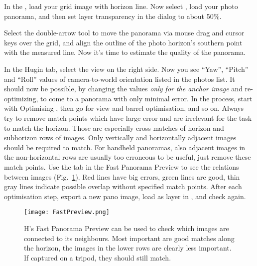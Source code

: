 In the , load your grid image with horizon line.  Now
select , load your photo panorama,
and then set layer transparency in the  dialog to about
50\%.

Select the double-arrow tool to move the panorama via mouse drag and
cursor keys over the grid, and align the outline of the photo
horizon's southern point with the measured line. Now it's time to
estimate the quality of the panorama.

In the Hugin  tab, select the  view on
the right side. Now you see ``Yaw'', ``Pitch'' and ``Roll'' values of
camera-to-world orientation listed in the photos list. It should now
be possible, by changing the values \emph{only for the anchor image}
and re-optimizing, to come to a panorama with only minimal error. In
the process, start with Optimising , then go for view and barrel optimisation, and so on. Always
try to remove match points which have large error and are irrelevant
for the task to match the horizon. Those are especially cross-matches
of horizon and subhorizon rows of images. Only vertically and
horizontally adjacent images should be required to match. For handheld
panoramas, also adjacent images in the non-horizontal rows are usually
too erroneous to be useful, just remove these match points. Use the
 tab in the Fast Panorama Preview to see the relations
between images (Fig.~\ref{fig:FastPanoPreview}). Red lines have big
errors, green lines are good, thin gray lines indicate possible
overlap without specified match points. After each optimisation step,
export a new pano image, load as layer in , and check
again.

\begin{figure}[tb]
  \centering
    \texttt{[image: FastPreview.png]}
    \caption{H's Fast Panorama Preview can be used to check which
      images are connected to its neighbours. Most important are good
      matches along the horizon, the images in the lower rows are
      clearly less important. If captured on a tripod, they should
      still match. }
  \label{fig:FastPanoPreview}
\end{figure}


\noindent
\colorbox{light-gray}{}




